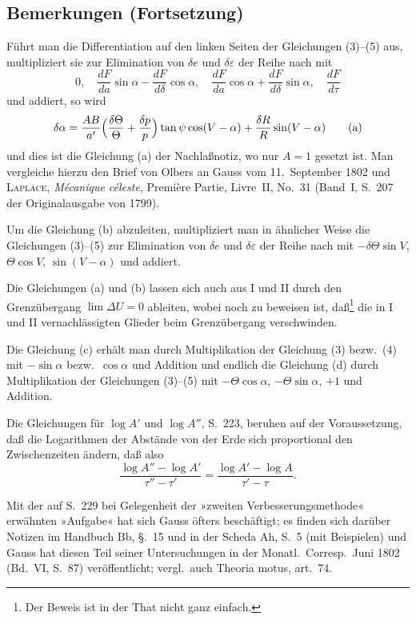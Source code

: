 \documentclass[12pt,a4paper]{article}
\theoremstyle{plain}
\theoremstyle{definition}
\theoremstyle{remark}
\begin{document}
\subsection*{Bemerkungen (Fortsetzung)}

Führt man die Differentiation auf den linken Seiten der Gleichungen (3)--(5) aus, multipliziert sie zur Elimination von $\delta e$ und $\delta\varepsilon$ der Reihe nach mit
\[
0,\quad \frac{dF}{da}\sin\alpha - \frac{dF}{d\delta}\cos\alpha,\quad
\frac{dF}{da}\cos\alpha + \frac{dF}{d\delta}\sin\alpha,\quad \frac{dF}{d\tau}
\]
und addiert, so wird
\begin{equation}
\delta\alpha = \frac{AB}{a'}\Bigl(\frac{\delta\Theta}{\Theta} + \frac{\delta p}{p}\Bigr)
\tan\psi\cos(V-\alpha) + \frac{\delta R}{R}\sin(V-\alpha)
\tag{a}
\end{equation}
und dies ist die Gleichung (a) der Nachlaßnotiz, wo nur $A=1$ gesetzt ist. Man vergleiche hierzu den Brief von Olbers an Gauss vom 11.~September 1802 und \textsc{Laplace}, \textit{Mécanique céleste}, Première Partie, Livre~II, No.~31 (Band~I, S.~207 der Originalausgabe von 1799).

Um die Gleichung (b) abzuleiten, multipliziert man in ähnlicher Weise die Gleichungen (3)--(5) zur Elimination von $\delta e$ und $\delta\varepsilon$ der Reihe nach mit $-\delta\Theta\sin V$, $\Theta\cos V$, $\sin(V-\alpha)$ und addiert.

Die Gleichungen (a) und (b) lassen sich auch aus I und II durch den Grenzübergang $\lim\Delta U = 0$ ableiten, wobei noch zu beweisen ist, daß\footnote{Der Beweis ist in der That nicht ganz einfach.} die in I und II vernachlässigten Glieder beim Grenzübergang verschwinden.

Die Gleichung (c) erhält man durch Multiplikation der Gleichung (3) bezw.\ (4) mit $-\sin\alpha$ bezw.\ $\cos\alpha$ und Addition und endlich die Gleichung (d) durch Multiplikation der Gleichungen (3)--(5) mit $-\Theta\cos\alpha$, $-\Theta\sin\alpha$, $+1$ und Addition.

Die Gleichungen für $\log A'$ und $\log A''$, S.~223, beruhen auf der Voraussetzung, daß die Logarithmen der Abstände von der Erde sich proportional den Zwischenzeiten ändern, daß also
\[
\frac{\log A'' - \log A'}{\tau'' - \tau'} = \frac{\log A' - \log A}{\tau' - \tau}.
\]

Mit der auf S.~229 bei Gelegenheit der »zweiten Verbesserungsmethode« erwähnten »Aufgabe« hat sich Gauss öfters beschäftigt; es finden sich darüber Notizen im Handbuch Bb, §.~15 und in der Scheda Ah, S.~5 (mit Beispielen) und Gauss hat diesen Teil seiner Untersuchungen in der Monatl.\ Corresp.\ Juni 1802 (Bd.~VI, S.~87) veröffentlicht; vergl.\ auch Theoria motus, art.~74.
\end{document}

